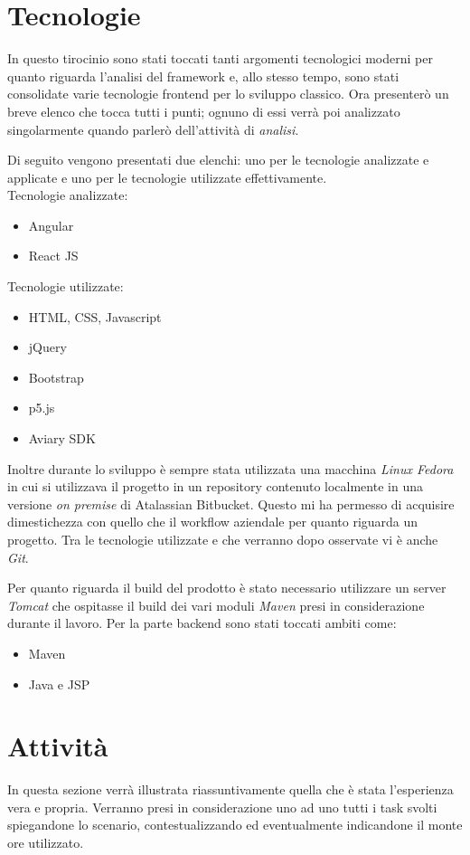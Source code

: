\documentclass[a4paper]{article}
\begin{document}
\section{Tecnologie}
\label{sec:Tecnologie}
\par In questo tirocinio sono stati toccati tanti argomenti tecnologici moderni
per quanto riguarda l'analisi del framework e, allo stesso tempo, sono stati con\-so\-li\-da\-te
varie tecnologie frontend per lo sviluppo classico. Ora presenterò un breve elenco
che tocca tutti i punti; ognuno di essi verrà poi analizzato singolarmente quando
parlerò dell'attività di \emph{analisi}.\\
\par Di seguito vengono presentati due elenchi: uno per le tecnologie analizzate e applicate
e uno per le tecnologie utilizzate effettivamente.\\
Tecnologie analizzate:
\begin{itemize}
	\item Angular 
	\item React JS
\end{itemize}
Tecnologie utilizzate:
\begin{itemize}
	\item HTML, CSS, Javascript
	\item jQuery
	\item Bootstrap
	\item p5.js
	\item Aviary SDK
\end{itemize}
\par Inoltre durante lo sviluppo è sempre stata utilizzata una macchina \emph{Linux Fedora}
in cui si utilizzava il progetto in un repository contenuto localmente in una versione
\emph{on premise} di Atalassian Bitbucket. Questo mi ha permesso di \mbox{acquisire} dimestichezza
con quello che il workflow aziendale per quanto riguarda un progetto.
Tra le tecnologie utilizzate e che verranno dopo osservate vi è anche \emph{Git}.\\
\par Per quanto riguarda il build del prodotto è stato necessario utilizzare un server
\emph{Tomcat} che ospitasse il build dei vari moduli \emph{Maven} presi in con\-si\-de\-ra\-zio\-ne
durante il lavoro.
Per la parte backend sono stati toccati ambiti come:
\begin{itemize}
	\item Maven
	\item Java e JSP
\end{itemize}
\section{Attività}
\par In questa sezione verrà illustrata riassuntivamente quella che è stata l'esperienza vera e propria.
Verranno presi in considerazione uno ad uno tutti i task svolti spie\-gan\-do\-ne lo scenario, contestualizzando
ed eventualmente indicandone il monte ore utilizzato.
\end{document}
